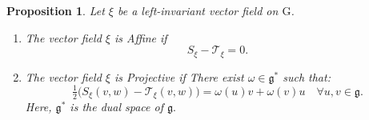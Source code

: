 \documentclass[10pt]{article}
\newtheorem{Proposition}{Proposition}
\begin{document}
\begin{Proposition} \label{propo}
Let $\xi$ be a left-invariant vector field on $\mathrm{G}$.
\begin{enumerate}
    \item The vector field $\xi$ is Affine if \begin{equation}
S_\xi-\mathscr{T}_\xi=0. \end{equation}
\item The vector field $\xi$ is Projective if There exist $\omega \in \mathfrak{g}^*$ such that:
\begin{equation}
   \tfrac12\big(S_\xi(v,w)-\mathscr{T}_\xi(v,w)\big)=\omega(u)v+\omega(v)u\quad \forall u,v\in \mathfrak{g}. \label{Aeq}
\end{equation}
Here, $\mathfrak{g}^*$ is the dual space of $\mathfrak{g}.$
\end{enumerate}
\end{Proposition} 
\end{document}
